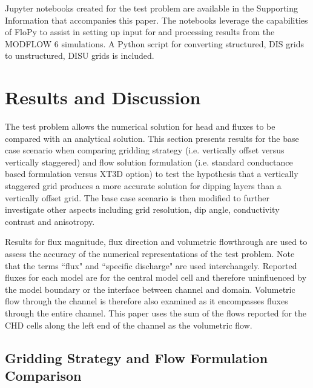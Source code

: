 \documentclass{article}
\begin{document}
Jupyter notebooks created for the test problem are available in the Supporting Information that accompanies this paper. The notebooks leverage the capabilities of FloPy \citep{bakker2016scripting} to assist in setting up input for and processing results from the MODFLOW 6 simulations. A Python script for converting structured, DIS grids to unstructured, DISU grids is included.

\section{Results and Discussion}

The test problem allows the numerical solution for head and fluxes to be compared with an analytical solution. This section presents results for the base case scenario when comparing gridding strategy (i.e. vertically offset versus vertically staggered) and flow solution formulation (i.e. standard conductance based formulation versus XT3D option) to test the hypothesis that a vertically staggered grid produces a more accurate solution for dipping layers than a vertically offset grid. The base case scenario is then modified to further investigate other aspects including grid resolution, dip angle, conductivity contrast and anisotropy. 

Results for flux magnitude, flux direction and volumetric flowthrough are used to assess the accuracy of the numerical representations of the test problem. Note that the terms ``flux"  and ``specific discharge" are used interchangely. Reported fluxes for each model are for the central model cell and therefore uninfluenced by the model boundary or the interface between channel and domain. Volumetric flow through the channel is therefore also examined as it encompasses fluxes through the entire channel. This paper uses the sum of the flows reported for the CHD cells along the left end of the channel as the volumetric flow. 

\subsection{Gridding Strategy and Flow Formulation Comparison}
\end{document}
